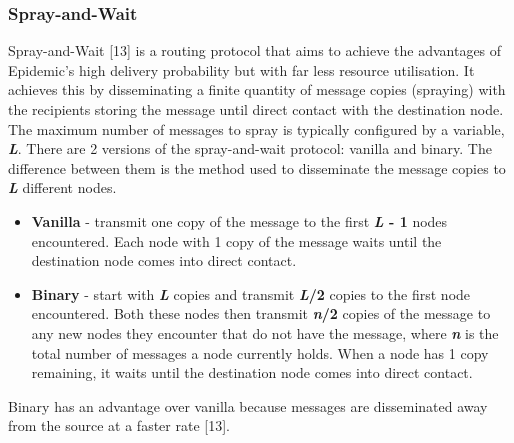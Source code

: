 \documentclass{article}
\begin{document}
\subsubsection{Spray-and-Wait}
Spray-and-Wait [13] is a routing protocol that aims to achieve the advantages of Epidemic's high delivery probability but with far less resource utilisation. It achieves this by disseminating a finite quantity of message copies (spraying) with the recipients storing the message until direct contact with the destination node. The maximum number of messages to spray is typically configured by a variable, \textbf{\textit{L}}. There are 2 versions of the spray-and-wait protocol: vanilla and binary. The difference between them is the method used to disseminate the message copies to \textbf{\textit{L}} different nodes.
\begin{itemize}
	\item \textbf{Vanilla} - transmit one copy of the message to the first \textbf{\textit{L} - 1} nodes encountered. Each node with 1 copy of the message waits until the destination node comes into direct contact.
	\item \textbf{Binary} - start with \textbf{\textit{L}} copies and transmit \textbf{\textit{L}/2} copies to the first node encountered. Both these nodes then transmit \textbf{\textit{n}/2} copies of the message to any new nodes they encounter that do not have the message, where \textbf{\textit{n}} is the total number of messages a node currently holds. When a node has 1 copy remaining, it waits until the destination node comes into direct contact.
\end{itemize}


\noindent Binary has an advantage over vanilla because messages are disseminated away from the source at a faster rate [13].
\end{document}
